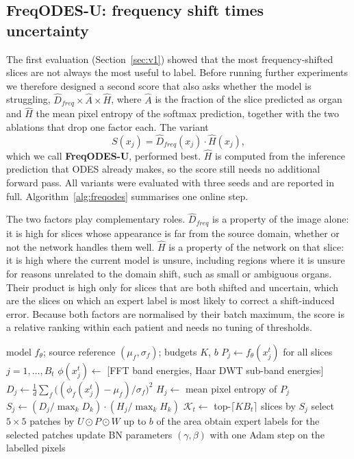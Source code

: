 \documentclass[a4paper,fleqn]{cas-dc}
\begin{document}
\subsection{FreqODES-U: frequency shift times uncertainty}
The first evaluation (Section~\ref{sec:v1}) showed that the most frequency-shifted slices are not always the most useful to label. Before running further experiments we therefore designed a second score that also asks whether the model is struggling, $\hat D_{freq}\times\hat A\times\hat H$, where $\hat A$ is the fraction of the slice predicted as organ and $\hat H$ the mean pixel entropy of the softmax prediction, together with the two ablations that drop one factor each. The variant
\begin{equation}
S(x_j)=\hat D_{freq}(x_j)\cdot\hat H(x_j),
\label{eq:su}
\end{equation}
which we call \textbf{FreqODES-U}, performed best. $\hat H$ is computed from the inference prediction that ODES already makes, so the score still needs no additional forward pass. All variants were evaluated with three seeds and are reported in full. Algorithm~\ref{alg:freqodes} summarises one online step.

The two factors play complementary roles. $\hat D_{freq}$ is a property of the image alone: it is high for slices whose appearance is far from the source domain, whether or not the network handles them well. $\hat H$ is a property of the network on that slice: it is high where the current model is unsure, including regions where it is unsure for reasons unrelated to the domain shift, such as small or ambiguous organs. Their product is high only for slices that are both shifted and uncertain, which are the slices on which an expert label is most likely to correct a shift-induced error. Because both factors are normalised by their batch maximum, the score is a relative ranking within each patient and needs no tuning of thresholds.

\begin{algorithm}[!htbp]
\caption{One online step of FreqODES-U for patient $t$}
\label{alg:freqodes}
\begin{algorithmic}[1]
\Require model $f_\theta$; source reference $(\mu_f,\sigma_f)$; budgets $K$, $b$
\State $P_j\gets f_\theta(x_j^t)$ for all slices $j=1,\dots,B_t$ 
  \State $\phi(x_j^t)\gets$ [FFT band energies, Haar DWT sub-band energies]
  \State $D_j\gets\frac1d\sum_f\big((\phi_f(x_j^t)-\mu_f)/\sigma_f\big)^2$ 
  \State $H_j\gets$ mean pixel entropy of $P_j$
\EndFor
\State $S_j\gets (D_j/\max_k D_k)\cdot(H_j/\max_k H_k)$
\State $\mathcal{K}_t\gets$ top-$\lceil K B_t\rceil$ slices by $S_j$
  \State select $5\times5$ patches by $U\odot P\odot W$ up to $b$ of the area 
  \State obtain expert labels for the selected patches
\EndFor
\State update BN parameters $(\gamma,\beta)$ with one Adam step on the labelled pixels
\end{algorithmic}
\end{algorithm}
\end{document}
